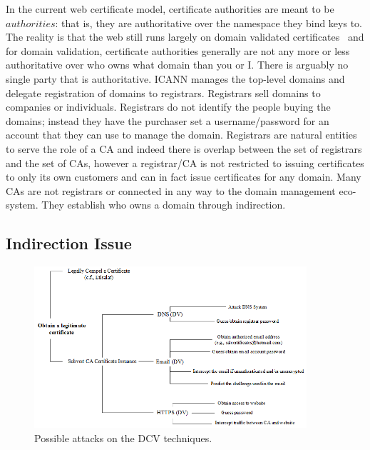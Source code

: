  In the current web certificate model, certificate authorities are meant to be $authorities$: that is, they are authoritative over the namespace they bind keys to. The reality is that the web still runs largely on domain validated certificates~\cite{DKBH13}\cite{HBKC11} and for domain validation, certificate authorities generally are not any more or less authoritative over who owns what domain than you or I. There is arguably no single party that is authoritative. ICANN manages the top-level domains and delegate registration of domains to registrars. Registrars sell domains to companies or individuals. Registrars do not identify the people buying the domains; instead they have the purchaser set a username/password for an account that they can use to manage the domain. Registrars are natural entities to serve the role of a CA and indeed there is overlap between the set of registrars and the set of CAs, however a registrar/CA is not restricted to issuing certificates to only its own customers and can in fact issue certificates for any domain. Many CAs are not registrars or connected in any way to the domain management eco-system. They establish who owns a domain through indirection.
 
\subsection{Indirection Issue}\label{indirection} 

\begin{figure}[t]
\centering
\includegraphics[width=0.9\textwidth]{Fig/attacksonDCV.png}
\caption{\footnotesize{Possible attacks on the DCV techniques.}}
\label{fig:attacksonDCV}
\end{figure}


